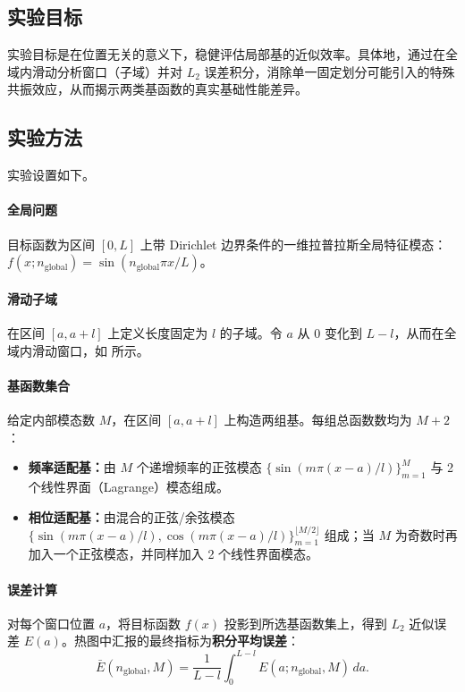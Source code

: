 \subsection{实验目标}
实验目标是在位置无关的意义下，稳健评估局部基的近似效率。具体地，通过在全域内滑动分析窗口（子域）并对 $L_2$ 误差积分，消除单一固定划分可能引入的特殊共振效应，从而揭示两类基函数的真实基础性能差异。

\subsection{实验方法}
实验设置如下。

\paragraph{全局问题}
目标函数为区间 $[0,L]$ 上带 Dirichlet 边界条件的一维拉普拉斯全局特征模态：
$f(x; n_{\text{global}})=\sin(n_{\text{global}}\pi x/L)$。

\paragraph{滑动子域}
在区间 $[a,a+l]$ 上定义长度固定为 $l$ 的子域。令 $a$ 从 $0$ 变化到 $L-l$，从而在全域内滑动窗口，如  所示。

\paragraph{基函数集合}
给定内部模态数 $M$，在区间 $[a,a+l]$ 上构造两组基。每组总函数数均为 $M+2$：
\begin{itemize}
  \item \textbf{频率适配基：}由 $M$ 个递增频率的正弦模态
  $\{\sin(m\pi(x-a)/l)\}_{m=1}^{M}$ 与 2 个线性界面（Lagrange）模态组成。
  \item \textbf{相位适配基：}由混合的正弦/余弦模态
  $\{\sin(m\pi(x-a)/l),\cos(m\pi(x-a)/l)\}_{m=1}^{\lfloor M/2 \rfloor}$ 组成；当 $M$ 为奇数时再加入一个正弦模态，并同样加入 2 个线性界面模态。
\end{itemize}

\paragraph{误差计算}
对每个窗口位置 $a$，将目标函数 $f(x)$ 投影到所选基函数集上，得到 $L_2$ 近似误差 $E(a)$。热图中汇报的最终指标为\textbf{积分平均误差}：
\begin{equation}
\bar{E}(n_{\text{global}}, M) = \frac{1}{L-l} \int_{0}^{L-l} E(a; n_{\text{global}}, M) \, da.
\end{equation}

